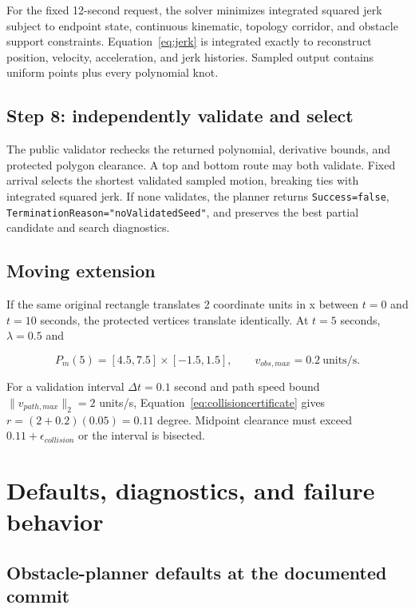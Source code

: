 \documentclass[10pt,letterpaper]{article}
\newcommand{\file}[1]{\nolinkurl{#1}}
\begin{document}
For the fixed 12-second request, the solver minimizes integrated squared jerk
subject to endpoint state, continuous kinematic, topology corridor, and
obstacle support constraints. Equation~\eqref{eq:jerk} is integrated exactly
to reconstruct position, velocity, acceleration, and jerk histories. Sampled
output contains uniform points plus every polynomial knot.

\subsection{Step 8: independently validate and select}

The public validator rechecks the returned polynomial, derivative bounds, and
protected polygon clearance. A top and bottom route may both validate. Fixed
arrival selects the shortest validated sampled motion, breaking ties with
integrated squared jerk. If none validates, the planner returns
\file{Success=false}, \file{TerminationReason="noValidatedSeed"}, and preserves
the best partial candidate and search diagnostics.

\subsection{Moving extension}

If the same original rectangle translates 2 coordinate units in x between
$t=0$ and $t=10$ seconds, the protected vertices translate identically. At
$t=5$ seconds, $\lambda=0.5$ and

\begin{equation}
P_m(5)=[4.5,7.5]\times[-1.5,1.5],\qquad v_{obs,max}=0.2\ \mathrm{units/s}.
\end{equation}

For a validation interval $\Delta t=0.1$ second and path speed bound
$\lVert v_{path,max}\rVert_2=2$ units/s, Equation~\eqref{eq:collisioncertificate}
gives $r=(2+0.2)(0.05)=0.11$ degree. Midpoint clearance must exceed
$0.11+\epsilon_{collision}$ or the interval is bisected.

\section{Defaults, diagnostics, and failure behavior}

\subsection{Obstacle-planner defaults at the documented commit}
\end{document}
